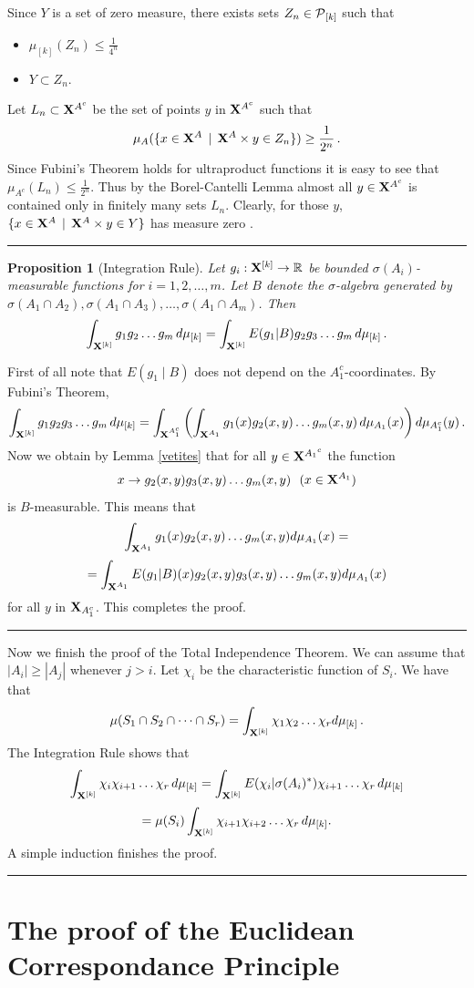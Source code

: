 \documentclass [11pt] {article}
\newcommand{\qed} {\hspace {0.1in} \rule {1.5mm} {3.5mm}}
\newtheorem{proposition}{Proposition}[section]
\def\proof{\smallskip\noindent{\it Proof.} }
\def\cP{\mbox{$\cal P$}}
\def\to{\rightarrow}
\def\xo{{\bf X}}
\def\xok{\xo^{[k]}}
\begin{document}
Since $Y$ is a set of zero measure, there exists sets $Z_n\in \cP_{[k]}$
such that
\begin{itemize}
\item
$\mu_{[k]}(Z_n)\leq \frac{1}{4^n}$
\item
$Y\subset Z_n$.
\end{itemize}
Let ${ L}_n\subset \xo^{A^c}$ be the set of points $y$ in $\xo^{A^c}$
such that $$ \mu_{A}(\{x\in \xo^A\,\mid\, \xo^{A}\times y \in Z_n\})\geq
\frac{1}{2^n}\,.$$
Since Fubini's Theorem holds for ultraproduct functions it is easy to see
that $\mu_{A^c}({L}_n)\leq \frac{1}{2^n}$.
Thus by the Borel-Cantelli Lemma almost all $y\in\xo^{A^c}$ is contained
only in finitely many sets $L_n$. Clearly,
for those $y$, $\{x\in \xo^A\,\mid\, \xo^{A}\times y \in Y\}$ has
measure zero . \qed
\begin{proposition}[Integration Rule]
Let $g_i:\xok\to\mathbb{R}$ be bounded
$\sigma(A_i)$-measurable functions for $i=1,2,\dots,m$. Let $B$ denote the
$\sigma$-algebra generated by
$\sigma(A_1\cap A_2),\sigma(A_1\cap A_3),\dots,\sigma(A_1\cap A_m)$. Then
$$\int_{\xok} g_1g_2\dots g_m\,d\mu_{[k]}=
\int_{\xok} E(g_1|B)g_2g_3\dots g_m\,d\mu_{[k]}\,.$$
\end{proposition}

\proof
First of all note that $E(g_1\mid B)$ does not depend on the
$A_1^c$-coordinates.
 By Fubini's Theorem,
$$\int_{\xok} g_1g_2g_3\dots
g_m\,d\mu_{[k]}=\int_{\xo^{A_1^c}}\left(\int_{\xo^{A_1}}
g_1(x) g_2(x,y)\dots g_m(x,y)\,d\mu_{A_1}(x)\right)d\mu_{A_1^c}(y)\, .$$
Now we obtain by Lemma \ref{vetites} that for all $y\in \xo^{{A_1}^c}$ the
function $$x\to g_2(x,y)g_3(x,y)\dots g_m(x,y)~~(x\in \xo^{A_1})$$ is
$B$-measurable.
This means that
$$\int_{\xo^{A_1}}g_1(x)g_2(x,y)\dots g_m(x,y) d\mu_{A_1}(x)=$$
$$=\int_{\xo^{A_1}}E(g_1|B)(x)g_2(x,y)g_3(x,y)\dots g_m(x,y) d\mu_{A_1}(x)$$
for all $y$ in $\xo_{A_1^c}$.
This completes the proof. \qed \vskip 0.2in

\noindent
Now we finish the proof of the Total Independence Theorem.
We can assume that $|A_i|\geq |A_j|$ whenever $j>i$. Let
  $\chi_i$ be the characteristic function of $S_i$. We have that
$$\mu(S_1\cap S_2\cap\dots\cap S_r)=\int_{\xok}\chi_1\chi_2\dots\chi_{r}
d\mu_{[k]}\,.$$
The Integration Rule shows that
$$\int_{\xok}\chi_i\chi_{i+1}\dots\chi_r\,d\mu_{[k]}=
\int_{\xok}E(\chi_i|\sigma(A_i)^*)\chi_{i+1}\dots\chi_r\,d\mu_{[k]}$$
$$=
\mu(S_i)\int_{\xok}
\chi_{i+1}\chi_{i+2}\dots\chi_r\,d\mu_{[k]}.$$
A simple induction finishes the proof. \qed
\section{The proof of the Euclidean Correspondance Principle}
\label{proofcorr}
\end{document}

